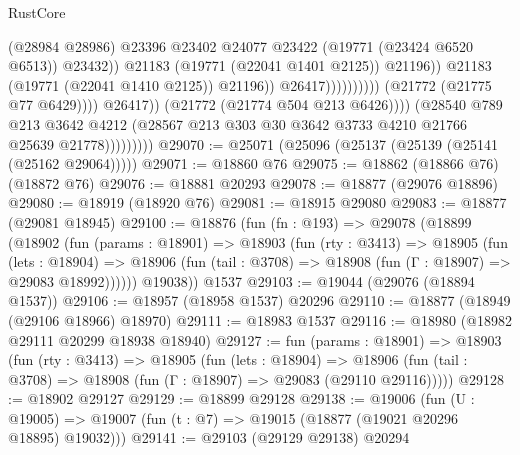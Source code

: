 \begin{lexlean}{RustCore}
\begin{coremodule}
                                                              (@28984 @28986)
                                                              @23396
                                                              @23402
                                                              @24077
                                                              @23422
                                                              (@19771 (@23424 @6520 @6513))
                                                              @23432))
                                                          @21183
                                                          (@19771 (@22041 @1401 @2125))
                                                          @21196))
                                                      @21183
                                                      (@19771 (@22041 @1410 @2125))
                                                      @21196))
                                                  @26417))))))))))
                              (@21772 (@21775 @77 @6429))))
                          @26417))
                      (@21772 (@21774 @504 @213 @6426))))
                  (@28540
                    @789
                    @213
                    @3642
                    @4212
                    (@28567 @213 @303 @30 @3642 @3733 @4210 @21766 @25639 @21778)))))))))
@29070 := @25071 (@25096 (@25137 (@25139 (@25141 (@25162 @29064)))))
@29071 := @18860 @76
@29075 := @18862 (@18866 @76) (@18872 @76)
@29076 := @18881 @20293
@29078 := @18877 (@29076 @18896)
@29080 := @18919 (@18920 @76)
@29081 := @18915 @29080
@29083 := @18877 (@29081 @18945)
@29100 := @18876
    (fun (fn : @193) =>
    @29078
      (@18899
        (@18902
          (fun (params : @18901) =>
          @18903
            (fun (rty : @3413) =>
            @18905
              (fun (lets : @18904) =>
              @18906 (fun (tail : @3708) => @18908 (fun (Γ : @18907) => @29083 @18992))))))
        @19038))
    @1537
@29103 := @19044 (@29076 (@18894 @1537))
@29106 := @18957 (@18958 @1537) @20296
@29110 := @18877 (@18949 (@29106 @18966) @18970)
@29111 := @18983 @1537
@29116 := @18980 (@18982 @29111 @20299 @18938 @18940)
@29127 := fun (params : @18901) =>
  @18903
    (fun (rty : @3413) =>
    @18905
      (fun (lets : @18904) =>
      @18906 (fun (tail : @3708) => @18908 (fun (Γ : @18907) => @29083 (@29110 @29116)))))
@29128 := @18902 @29127
@29129 := @18899 @29128
@29138 := @19006
    (fun (U : @19005) => @19007 (fun (t : @7) => @19015 (@18877 (@19021 @20296 @18895) @19032)))
@29141 := @29103 (@29129 @29138) @20294

\end{coremodule}
\end{lexlean}

